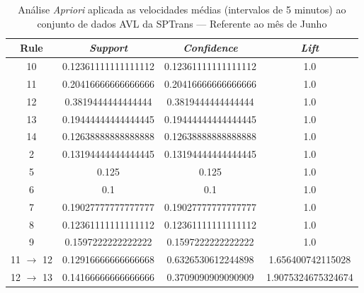 \documentclass[
	12pt,				%
	oneside,			%
	a4paper,			%
	english,			%
	brazil				%
	]{abntex2ppgsi}
\begin{document}
\begin{apendicesenv}
\begin{table}[!htb]
\centering
\caption {Análise \textit{Apriori} aplicada as velocidades médias (intervalos de 5 minutos) ao conjunto de dados AVL da SPTrans --- Referente ao mês de Junho}
\label {tab:aprioriJune}
\begin{tabular}{c|c|c|c}
\hline
\textbf{Rule} & \textit{\textbf{Support}} & \textit{\textbf{Confidence}} & \textit{\textbf{Lift}} \\
\hline
10 &  0.12361111111111112 &  0.12361111111111112 &  1.0\\
\hline
11 &  0.20416666666666666 &  0.20416666666666666 &  1.0\\
\hline
12 &  0.3819444444444444 &  0.3819444444444444 &  1.0\\
\hline
13 &  0.19444444444444445 &  0.19444444444444445 &  1.0\\
\hline
14 &  0.12638888888888888 &  0.12638888888888888 &  1.0\\
\hline
2 &  0.13194444444444445 &  0.13194444444444445 &  1.0\\
\hline
5 &  0.125 &  0.125 &  1.0\\
\hline
6 &  0.1 &  0.1 &  1.0\\
\hline
7 &  0.19027777777777777 &  0.19027777777777777 &  1.0\\
\hline
8 &  0.12361111111111112 &  0.12361111111111112 &  1.0\\
\hline
9 &  0.1597222222222222 &  0.1597222222222222 &  1.0\\
\hline
11 $\rightarrow$ 12 &  0.12916666666666668 &  0.6326530612244898 &  1.656400742115028\\
\hline
12 $\rightarrow$ 13 &  0.14166666666666666 &  0.3709090909090909 &  1.9075324675324674\\
\hline
\end{tabular}
\end{table}


\end{apendicesenv}
\end{document}
